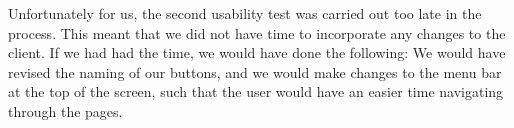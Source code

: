 Unfortunately for us, the second usability test was carried out too late in the process. This meant that we did not have time to incorporate any changes to the client. If we had had the time, we would have done the following: We would have revised the naming of our buttons, and we would make changes to the menu bar at the top of the screen, such that the user would have an easier time navigating through the pages.